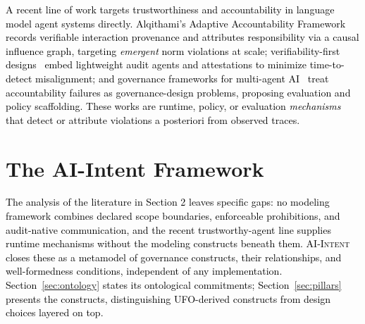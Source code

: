 \documentclass[runningheads]{llncs}
\begin{document}
\textcolor{black}{A recent line of work targets trustworthiness and accountability in language model agent systems directly. Alqithami's Adaptive Accountability Framework~\cite{alqithami2025adaptive} records verifiable interaction provenance and attributes responsibility via a causal influence graph, targeting \emph{emergent} norm violations at scale; verifiability-first designs~\cite{gupta2025verifiability} embed lightweight audit agents and attestations to minimize time-to-detect misalignment; and governance frameworks for multi-agent AI~\cite{pujari2024ethical,bamil2026unified,am2026self} treat accountability failures as governance-design problems,  proposing evaluation and policy scaffolding. These works 
are runtime, policy, or evaluation \emph{mechanisms}  that detect or attribute violations a posteriori from observed traces.}


\section{The AI-Intent Framework}
\label{sec:framework}

\textcolor{black}{The analysis of the literature in Section 2 leaves specific gaps: no modeling framework combines declared scope boundaries, enforceable prohibitions, and audit-native communication, and the recent trustworthy-agent line supplies runtime mechanisms without the modeling constructs beneath them. \textsc{AI-Intent} closes these as a metamodel of governance constructs, their relationships, and well-formedness conditions, independent of any implementation. Section~\ref{sec:ontology} states its ontological commitments; Section~\ref{sec:pillars} presents the constructs, distinguishing UFO-derived constructs from design choices layered on top.}
\end{document}
